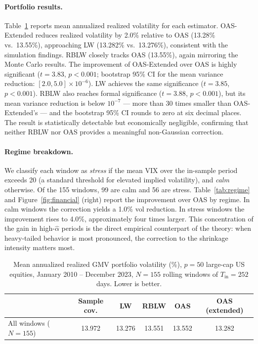 \documentclass[10pt,twoside,titlepage]{article}
\begin{document}
\paragraph{Portfolio results.}
Table~\ref{tab:financial} reports mean annualized realized volatility for each estimator.
OAS-Extended reduces realized volatility by 2.0\% relative to OAS
(13.28\% vs.\ 13.55\%), approaching LW (13.282\% vs.\ 13.276\%),
consistent with the simulation findings.
RBLW closely tracks OAS (13.55\%), again mirroring the Monte Carlo results.
The improvement of OAS-Extended over OAS is highly significant
($t = 3.83$, $p < 0.001$; bootstrap 95\% CI for the mean variance reduction:
$[2.0, 5.0] \times 10^{-6}$).
LW achieves the same significance ($t = 3.85$, $p < 0.001$).
RBLW also reaches formal significance ($t = 3.88$, $p < 0.001$), but its mean variance
reduction is below $10^{-7}$ --- more than 30 times smaller than OAS-Extended's ---
and the bootstrap 95\% CI rounds to zero at six decimal places.
The result is statistically detectable but economically negligible, confirming that
neither RBLW nor OAS provides a meaningful non-Gaussian correction.

\paragraph{Regime breakdown.}
We classify each window as \emph{stress} if the mean VIX over the in-sample period
exceeds 20 (a standard threshold for elevated implied volatility), and \emph{calm}
otherwise.
Of the 155 windows, 99 are calm and 56 are stress.
Table~\ref{tab:regime} and Figure~\ref{fig:financial} (right) report the improvement
over OAS by regime.
In calm windows the correction yields a 1.0\% vol reduction.
In stress windows the improvement rises to 4.0\%, approximately four times larger.
This concentration of the gain in high-$\hat{\alpha}$ periods is the direct
empirical counterpart of the theory: when heavy-tailed behavior is most pronounced,
the correction to the shrinkage intensity matters most.

\begin{table}[ht]
\centering
\caption{Mean annualized realized GMV portfolio volatility (\%), $p=50$ large-cap
US equities, January 2010 -- December 2023, $N=155$ rolling windows of
$T_{\mathrm{in}}=252$ days. Lower is better.}
\label{tab:financial}
\begin{tabular}{lccccc}
\toprule
& Sample cov. & LW & RBLW & OAS & OAS (extended) \\
\midrule
All windows ($N=155$) & 13.972 & 13.276 & 13.551 & 13.552 & 13.282 \\
\bottomrule
\end{tabular}
\end{table}
\end{document}
